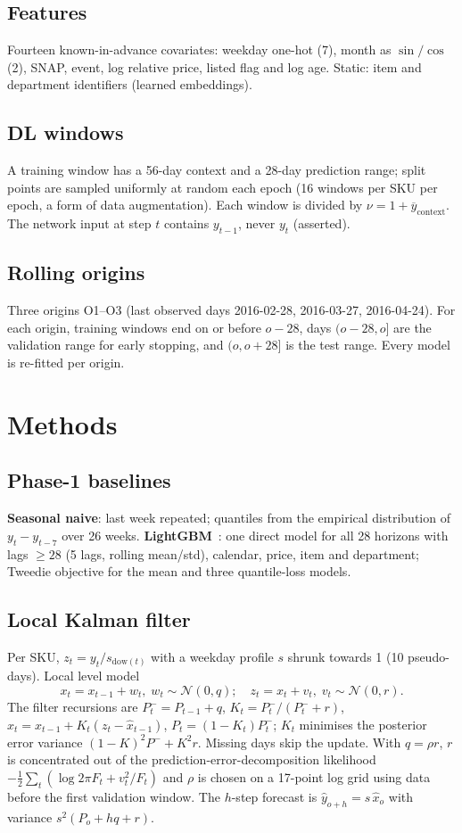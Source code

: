 \documentclass[conference]{IEEEtran}
\begin{document}
\subsection{Features}
Fourteen known-in-advance covariates: weekday one-hot (7), month as $\sin/\cos$ (2), SNAP, event, log relative price, listed flag and
log age. Static: item and department identifiers (learned embeddings).

\subsection{DL windows}
A training window has a 56-day context and a 28-day prediction range; split points are sampled uniformly at random each epoch
(16 windows per SKU per epoch, a form of data augmentation). Each window is divided by $\nu=1+\overline{y}_{\text{context}}$.
The network input at step $t$ contains $y_{t-1}$, never $y_t$ (asserted).

\subsection{Rolling origins}
Three origins O1--O3 (last observed days 2016-02-28, 2016-03-27, 2016-04-24). For each origin, training windows end on or before
$o-28$, days $(o-28,o]$ are the validation range for early stopping, and $(o,o+28]$ is the test range. Every model is re-fitted per origin.

\section{Methods}
\subsection{Phase-1 baselines}
\textbf{Seasonal naive}: last week repeated; quantiles from the empirical distribution of $y_t-y_{t-7}$ over 26 weeks.
\textbf{LightGBM}~\cite{ke2017lightgbm}: one direct model for all 28 horizons with lags $\ge 28$ (5 lags, rolling mean/std),
calendar, price, item and department; Tweedie objective for the mean and three quantile-loss models.

\subsection{Local Kalman filter}
Per SKU, $z_t=y_t/s_{\mathrm{dow}(t)}$ with a weekday profile $s$ shrunk towards 1 (10 pseudo-days). Local level model
\begin{equation}
x_t=x_{t-1}+w_t,\; w_t\sim\mathcal N(0,q);\quad z_t=x_t+v_t,\; v_t\sim\mathcal N(0,r).
\end{equation}
The filter recursions are $P^-_t=P_{t-1}+q$, $K_t=P^-_t/(P^-_t+r)$, $\hat x_t=\hat x_{t-1}+K_t(z_t-\hat x_{t-1})$, $P_t=(1-K_t)P^-_t$;
$K_t$ minimises the posterior error variance $(1-K)^2P^-+K^2r$. Missing days skip the update. With $q=\rho r$, $r$ is concentrated out of the
prediction-error-decomposition likelihood $-\tfrac12\sum_t(\log 2\pi F_t+v_t^2/F_t)$ and $\rho$ is chosen on a 17-point log grid
using data before the first validation window. The $h$-step forecast is
$\hat y_{o+h}=s\,\hat x_o$ with variance $s^2(P_o+hq+r)$.
\end{document}
